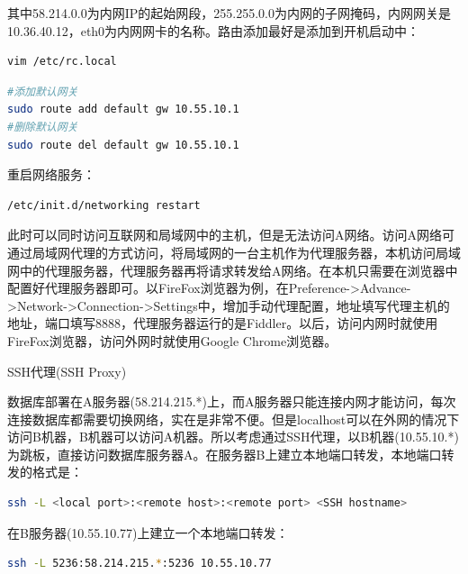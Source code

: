 \documentclass[12pt]{book}
\makeatletter
\numberwithin{dummy}{section}
\theoremstyle{ocrenumbox}
\theoremstyle{blacknumex}
\theoremstyle{blacknumbox}
\theoremstyle{ocrenum}
\renewcommand\paragraph{\@startsection{paragraph}{4}{\z@}
	{-2ex \@plus-.2ex \@minus .2ex}
	{.1ex}
	{\normalfont\small\sffamily\bfseries}}
\makeatother
\begin{document}
其中58.214.0.0为内网IP的起始网段，255.255.0.0为内网的子网掩码，内网网关是10.36.40.12，eth0为内网网卡的名称。路由添加最好是添加到开机启动中：

\begin{lstlisting}[language=Bash]
vim /etc/rc.local
\end{lstlisting}


\begin{lstlisting}[language=Bash]
#添加默认网关
sudo route add default gw 10.55.10.1
#删除默认网关
sudo route del default gw 10.55.10.1
\end{lstlisting}

重启网络服务：

\begin{lstlisting}[language=Bash]
/etc/init.d/networking restart
\end{lstlisting}

此时可以同时访问互联网和局域网中的主机，但是无法访问A网络。访问A网络可通过局域网代理的方式访问，将局域网的一台主机作为代理服务器，本机访问局域网中的代理服务器，代理服务器再将请求转发给A网络。在本机只需要在浏览器中配置好代理服务器即可。以FireFox浏览器为例，在Preference->Advance->Network->Connection->Settings中，增加手动代理配置，地址填写代理主机的地址，端口填写8888，代理服务器运行的是Fiddler。以后，访问内网时就使用FireFox浏览器，访问外网时就使用Google Chrome浏览器。

\paragraph{SSH代理(SSH Proxy)}
\label{paragraph:sshproxy}

数据库部署在A服务器(58.214.215.*)上，而A服务器只能连接内网才能访问，每次连接数据库都需要切换网络，实在是非常不便。但是localhost可以在外网的情况下访问B机器，B机器可以访问A机器。所以考虑通过SSH代理，以B机器(10.55.10.*)为跳板，直接访问数据库服务器A。在服务器B上建立本地端口转发，本地端口转发的格式是：

\begin{lstlisting}[language=Bash]
ssh -L <local port>:<remote host>:<remote port> <SSH hostname>
\end{lstlisting}

在B服务器(10.55.10.77)上建立一个本地端口转发：

\begin{lstlisting}[language=Bash]
ssh -L 5236:58.214.215.*:5236 10.55.10.77
\end{lstlisting}
\end{document}
